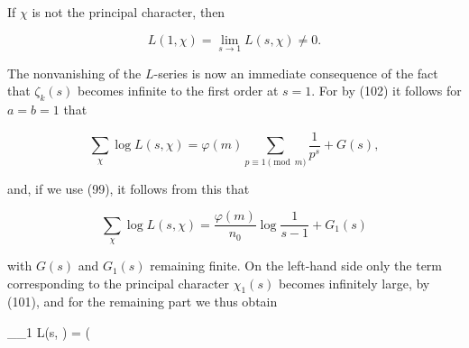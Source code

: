If $\chi$ is not the principal character, then

$$L(1, \chi) = \lim_{s \to 1} L(s, \chi) \neq 0.$$

The nonvanishing of the $L$-series is now an immediate consequence of the fact that $\zeta_k(s)$ becomes infinite to the first order at $s = 1$. For by (102) it follows for $a = b = 1$ that

$$\sum_{\chi} \log L(s, \chi) = \varphi(m) \sum_{p \equiv 1 \pmod{m}} \frac{1}{p^s} + G(s),$$

and, if we use (99), it follows from this that

$$\sum_{\chi} \log L(s, \chi) = \frac{\varphi(m)}{n_0} \log \frac{1}{s - 1} + G_1(s)$$

with $G(s)$ and $G_1(s)$ remaining finite. On the left-hand side only the term corresponding to the principal character $\chi_1(s)$ becomes infinitely large, by (101), and for the remaining part we thus obtain

$$\sum_{\chi \neq \chi_1} \log L(s, \chi) = \left( \frac
